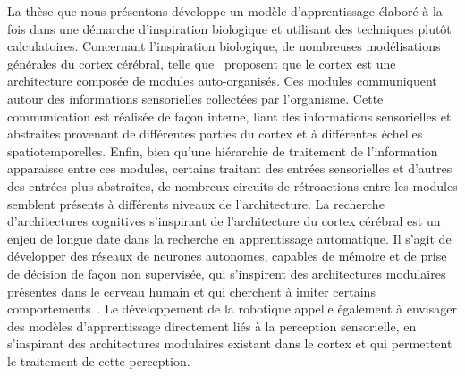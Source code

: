 La thèse que nous présentons développe un modèle d'apprentissage élaboré à la fois dans une démarche d'inspiration biologique et utilisant des techniques plutôt calculatoires.
Concernant l'inspiration biologique, de nombreuses modélisations générales du cortex cérébral, telle que~\cite{binzegger05, Meunier2009HierarchicalMI,sporns_structure_2013,betzel_multi-scale_2017} proposent que le cortex est une architecture composée de modules auto-organisés.
Ces modules communiquent autour des informations sensorielles collectées par l'organisme. Cette communication est réalisée de façon interne, liant des informations sensorielles et abstraites provenant de différentes parties du cortex et à différentes échelles spatiotemporelles. Enfin, bien qu'une hiérarchie de traitement de l'information apparaisse entre ces modules, certains traitant des entrées sensorielles et d'autres des entrées plus abstraites, de nombreux circuits de rétroactions entre les modules semblent présents à différents niveaux de l'architecture.
La recherche d'architectures cognitives s'inspirant de l'architecture du cortex cérébral est un enjeu de longue date dans la recherche en apprentissage automatique. Il s'agit de développer des réseaux de neurones autonomes, capables de mémoire et de prise de décision de façon non supervisée, qui s'inspirent des architectures modulaires présentes dans le cerveau humain et qui cherchent à imiter certains comportements~\cite{Kotseruba201840YO}.
Le développement de la robotique appelle également à envisager des modèles d'apprentissage directement liés à la perception sensorielle, en s'inspirant des architectures modulaires existant dans le cortex et qui permettent le traitement de cette perception.

